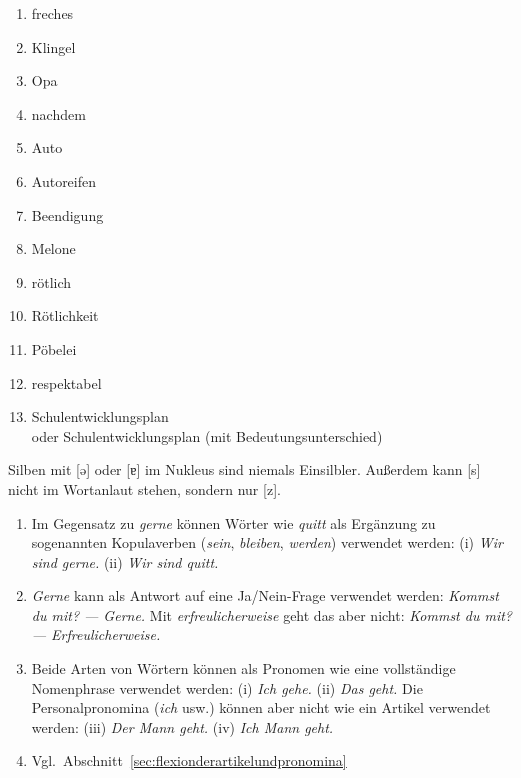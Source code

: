 \label{sol:phonologie05}

\begin{enumerate}
  \item \Akz freches
  \item \Akz Klingel
  \item \Akz Opa
  \item nach\Akz dem
  \item \Akz Auto
  \item \Akz Autoreifen
  \item Be\Akz endigung
  \item Me\Akz lone
  \item \Akz rötlich
  \item \Akz Rötlichkeit
  \item Pöbe\Akz lei
  \item respek\Akz tabel
  \item \Akz Schulentwicklungsplan\\
    oder Schulent\Akz wicklungsplan (mit Bedeutungsunterschied)
\end{enumerate}

\label{sol:phonologie07}

Silben mit [ə] oder [ɐ] im Nukleus sind niemals Einsilbler.
Außerdem kann [s] nicht im Wortanlaut stehen, sondern nur [z].


\label{sol:wortklassen02}

\begin{sloppypar}

\begin{enumerate}
  \item Im Gegensatz zu \textit{gerne} können Wörter wie \textit{quitt} als Ergänzung zu sogenannten Kopulaverben (\textit{sein}, \textit{bleiben}, \textit{werden}) verwendet werden:
    (i) \Ast \textit{Wir sind gerne.} (ii) \textit{Wir sind quitt.}
  \item \textit{Gerne} kann als Antwort auf eine Ja\slash Nein-Frage verwendet werden:
    \textit{Kommst du mit? --- Gerne.}
    Mit \textit{erfreulicherweise} geht das aber nicht:
    \textit{Kommst du mit? --- \Ast Erfreulicherweise.}
  \item Beide Arten von Wörtern können als Pronomen wie eine vollständige Nomenphrase verwendet werden:
    (i) \textit{Ich gehe.}
    (ii) \textit{Das geht.}
    Die Personalpronomina (\textit{ich} usw.) können aber nicht wie ein Artikel verwendet werden:
    (iii) \textit{Der Mann geht.}
    (iv) \Ast \textit{Ich Mann geht.}
  \item Vgl.\ Abschnitt~\ref{sec:flexionderartikelundpronomina}
\end{enumerate}

\end{sloppypar}

